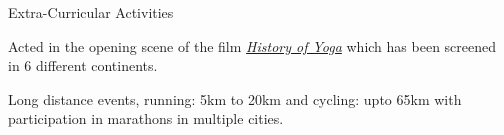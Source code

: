 \documentclass{resume} %
\begin{document}
\begin{rSection}{Extra-Curricular Activities}

\vspace{-0.75em}

\begin{rSubsection}{}{} {} {} 
\item Acted in the opening scene of the film \href{https://youtu.be/JoRwXMLsVis?t=29}{\emph{History of Yoga}} which has been screened in 6 different continents.
\item Long distance events, running: 5km to 20km and cycling: upto 65km with participation in marathons in multiple cities.
\end{rSubsection}

\end{rSection}


\end{document}
